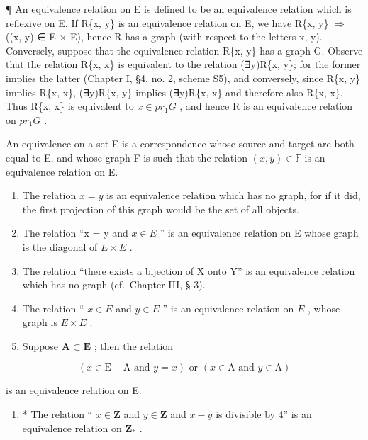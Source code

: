 ¶ An equivalence relation on E is defined to be an equivalence relation which is reflexive on E. If R\{x, y\} is an equivalence relation on E, we have R\{x, y\} \(\Longrightarrow\) ((x, y) ∈ E × E), hence R has a graph (with respect to the letters x, y). Conversely, suppose that the equivalence relation R\{x, y\} has a graph G. Observe that the relation R\{x, x\} is equivalent to the relation (∃y)R\{x, y\}; for the former implies the latter (Chapter I, §4, no. 2, scheme S5), and conversely, since R\{x, y\} implies R\{x, x\}, (∃y)R\{x, y\} implies (∃y)R\{x, x\} and therefore also R\{x, x\}. Thus R\{x, x\} is equivalent to \(x \in pr_{1}G\) , and hence R is an equivalence relation on \(pr_{1}G\) .

An equivalence on a set E is a correspondence whose source and target are both equal to E, and whose graph F is such that the relation \((x, y) \in \mathbb{F}\) is an equivalence relation on E.


\begin{enumerate}
\def\labelenumi{(\arabic{enumi})}
\item
  The relation \(x = y\) is an equivalence relation which has no graph, for if it did, the first projection of this graph would be the set of all objects.
\item
  The relation ``x = y and \(x \in E\) '' is an equivalence relation on E whose graph is the diagonal of \(E \times E\) .
\item
  The relation ``there exists a bijection of X onto Y'' is an equivalence relation which has no graph (cf.~Chapter III, § 3).
\item
  The relation `` \(x \in E\) and \(y \in E\) '' is an equivalence relation on \(E\) , whose graph is \(E \times E\) .
\item
  Suppose \(\mathbf{A} \subset \mathbf{E}\) ; then the relation
\end{enumerate}

\[
(x \in \mathrm{E} - \mathrm{A} \text { and } y = x) \text { or } (x \in \mathrm{A} \text { and } y \in \mathrm{A})
\]

is an equivalence relation on E.

\begin{enumerate}
\def\labelenumi{(\arabic{enumi})}
\setcounter{enumi}{5}
\tightlist
\item
  * The relation `` \(x \in \mathbf{Z}\) and \(y \in \mathbf{Z}\) and \(x - y\) is divisible by 4'' is an equivalence relation on \(\mathbf{Z}_{*}\) .
\end{enumerate}

